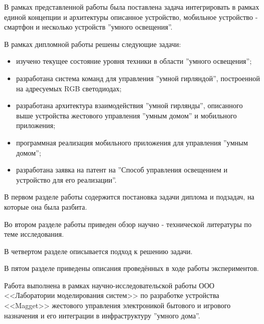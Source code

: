 В рамках представленной работы была поставлена задача интегрировать в рамках единой концепции и архитектуры описанное устройство, мобильное устройство - смартфон и несколько устройств ''умного освещения''.

В рамках дипломной работы решены следующие задачи:

\begin{itemize}
	\item изучено текущее состояние уровня техники в области ''умного освещения'';  
    \item разработана система команд для управления ''умной гирляндой'', построенной на адресуемых RGB светодиодах; 
    \item разработана архитектура взаимодействия  ''умной гирлянды'', описанного выше устройства жестового управления ''умным домом'' и мобильного приложения;
    \item  программная реализация мобильного приложения для управления ''умным домом'';
    \item  разработана заявка на патент на ''Способ управления освещением и устройство для его реализации''.
\end{itemize}

 
В первом разделе работы содержится постановка задачи диплома и подзадач, на которые она была разбита.

Во втором разделе работы приведен обзор научно - технической литературы по теме исследования.

В четвертом разделе описывается подход к решению задачи.

В пятом разделе приведены описания проведённых в ходе работы экспериментов.

  

Работа выполнена в рамках научно-исследовательской работы ООО <<Лаборатории моделирования систем>> по разработке устройства <<Magget>> жестового управления электроникой бытового и игрового назначения и его интеграции в инфраструктуру ''умного дома''.